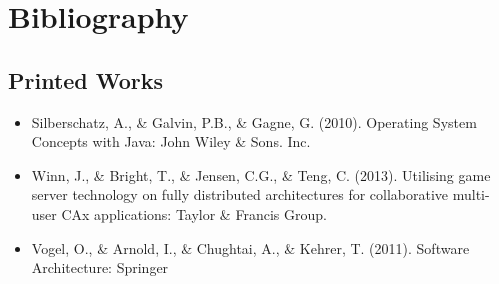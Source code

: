 
\section{Bibliography}

\subsection{Printed Works}
\begin{itemize}
	\item Silberschatz, A., \& Galvin, P.B., \& Gagne, G. (2010).
   Operating System Concepts with Java: John Wiley \& Sons. Inc.
   \item Winn, J., \& Bright, T., \& Jensen, C.G., \& Teng, C. (2013). Utilising game server technology on fully distributed architectures for collaborative multi-user CAx applications: Taylor \& Francis Group.
   \item Vogel, O., \& Arnold, I., \& Chughtai, A., \& Kehrer, T. (2011). Software Architecture: Springer
\end{itemize}

